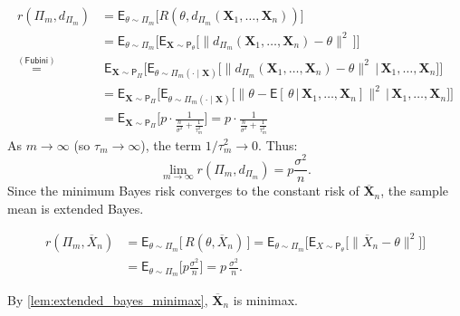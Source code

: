 \begin{ex}
\[
	\begin{split} r(\Pi_m, d_{\Pi_m}) &= \mathsf{E}_{\theta \sim \Pi_m} \Big[ R(\theta, d_{\Pi_m}(\mathbf{X}_1, \dots, \mathbf{X}_n)) \Big] \\ &= \mathsf{E}_{\theta \sim \Pi_m} \Big[ \mathsf{E}_{\mathbf{X} \sim \mathsf{P}_{\theta}} \big[ \| d_{\Pi_m}(\mathbf{X}_1, \dots, \mathbf{X}_n) - \theta \|^2 \, \big] \Big] \\ \overset{(\mathsf{Fubini})}{=} &\; \mathsf{E}_{\mathbf{X} \sim \mathsf{P}_\Pi} \Big[ \mathsf{E}_{\theta \sim \Pi_m(\cdot \mid \mathbf{X})} \big[ \| d_{\Pi_m}(\mathbf{X}_1, \dots, \mathbf{X}_n) - \theta \|^2 \, \big| \, \mathbf{X}_1, \dots, \mathbf{X}_n \big] \Big] \\ &= \mathsf{E}_{\mathbf{X} \sim \mathsf{P}_\Pi} \Big[ \mathsf{E}_{\theta \sim \Pi_m(\cdot \mid \mathbf{X})} \big[ \| \theta - \mathsf{E}[\, \theta \, | \, \mathbf{X}_1, \dots, \mathbf{X}_n] \|^2 \, \big| \, \mathbf{X}_1, \dots, \mathbf{X}_n \big] \Big] \\ &= \mathsf{E}_{\mathbf{X} \sim \mathsf{P}_\Pi} \Bigg[ p \cdot \frac{1}{\frac{n}{\sigma^2} + \frac{1}{\tau_m^2}} \Bigg] = p \cdot \frac{1}{\frac{n}{\sigma^2} + \frac{1}{\tau_m^2}} 
    \end{split}
\]
As \(m \to \infty\) (so \(\tau_m \to \infty\)), the term \(1/\tau_m^2 \to 0\). Thus:
\[
\lim_{m \to \infty} r(\Pi_m, d_{\Pi_m}) = p \frac{\sigma^2}{n}.
\]
Since the minimum Bayes risk converges to the constant risk of \(\overline{\mathbf{X}}_n\), the sample mean is extended Bayes. 

\[\begin{split} r(\Pi_m, \overline{X}_n) &= \mathsf{E}_{\theta \sim \Pi_m} \big[ \, R(\theta, \overline{X}_n) \, \big] = \mathsf{E}_{\theta \sim \Pi_m} \big[ \mathsf{E}_{X \sim \mathsf{P}_\theta} \big[ \| \overline{X}_n - \theta \|^2 \big] \big] \\ &= \mathsf{E}_{\theta \sim \Pi_m} \Big[ p \frac{\sigma^2}{n} \Big] = p \, \frac{\sigma^2}{n}. \end{split}\]

By \autoref{lem:extended_bayes_minimax}, \(\overline{\mathbf{X}}_n\) is minimax.
\end{ex}

